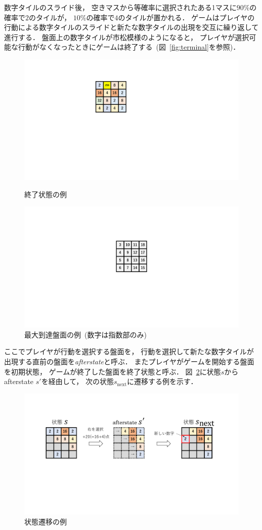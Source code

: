 数字タイルのスライド後， 空きマスから等確率に選択されたある1マスに$90\%$の確率で$2$のタイルが， $10\%$の確率で$4$のタイルが置かれる． 
ゲームはプレイヤの行動による数字タイルのスライドと新たな数字タイルの出現を交互に繰り返して進行する．
盤面上の数字タイルが市松模様のようになると， プレイヤが選択可能な行動がなくなったときにゲームは終了する~(図~\ref{fig:terminal}を参照)．
\begin{figure}[h]
    \begin{minipage}[T]{0.4\columnwidth}
        \centering
        \includegraphics[width=0.4\columnwidth]{figures/terminal_.pdf}
        \caption{終了状態の例}
        \label{fig:terminal}
    \end{minipage}
    \begin{minipage}[T]{0.4\columnwidth}
        \centering
        \includegraphics[width=0.4\columnwidth]{figures/limit.pdf}
        \caption{最大到達盤面の例~(数字は指数部のみ)}
        \label{fig:limit}
    \end{minipage}
\end{figure}

ここでプレイヤが行動を選択する盤面を， 行動を選択して新たな数字タイルが出現する直前の盤面を\textit{afterstate}と呼ぶ．
またプレイヤがゲームを開始する盤面を初期状態， ゲームが終了した盤面を終了状態と呼ぶ．
図~\ref{fig:transition}に状態$s$からafterstate $s'$を経由して， 次の状態$s_{\text{next}}$に遷移する例を示す．

\begin{figure}[t]
    \centering
    \includegraphics[width=\linewidth{}]{figures/transition_.pdf}
    \caption{状態遷移の例}
    \label{fig:transition}
\end{figure}

